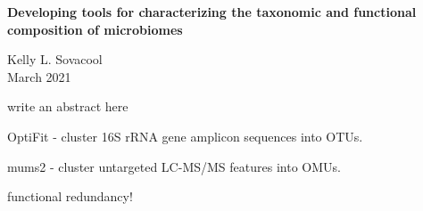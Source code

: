 \documentclass[11pt]{article}
\begin{document}
\sloppy
\begin{center}
\large{\textbf{
    Developing tools for characterizing the taxonomic and functional composition of microbiomes
}}

\vspace{11pt}

\small{
    Kelly L. Sovacool \\
    March 2021
}
\end{center}

write an abstract here

OptiFit - cluster 16S rRNA gene amplicon sequences into OTUs.

mums2 - cluster untargeted LC-MS/MS features into OMUs.

functional redundancy!
\end{document}
